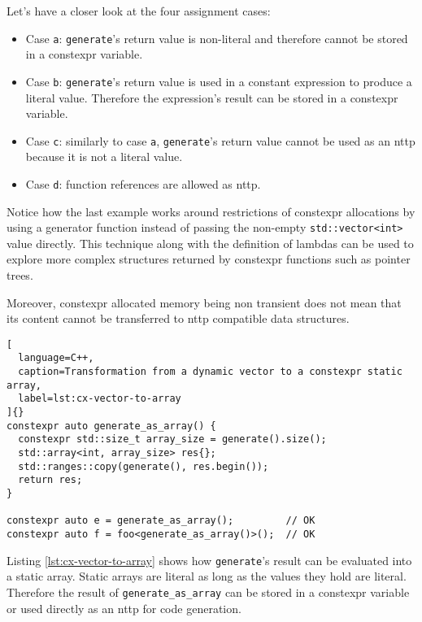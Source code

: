\documentclass[../main]{subfiles}
\begin{document}
Let's have a closer look at the four assignment cases:

\begin{itemize}
\item Case \lstinline{a}: \lstinline{generate}'s return value is non-literal
      and therefore cannot be stored in a \gls{constexpr} variable.
\item Case \lstinline{b}: \lstinline{generate}'s return value is used in a
      constant expression to produce a literal value.
      Therefore the expression's result can be stored in a \gls{constexpr} variable.
\item Case \lstinline{c}: similarly to case \lstinline{a},
      \lstinline{generate}'s return value cannot be used as an \gls{nttp} because it
      is not a literal value.
\item Case \lstinline{d}: function references are allowed as \gls{nttp}\acrpluralsuffix{}.
\end{itemize}

Notice how the last example works around restrictions of \gls{constexpr} allocations
by using a generator function instead of passing the non-empty
\lstinline{std::vector<int>} value directly. This technique along with the
definition of lambdas can be used to explore more complex structures returned by
\gls{constexpr} functions such as pointer trees.

Moreover, \gls{constexpr} allocated memory being non transient does not mean that its
content cannot be transferred to \gls{nttp} compatible data structures.

\begin{lstlisting}[
  language=C++,
  caption=Transformation from a dynamic vector to a constexpr static array,
  label=lst:cx-vector-to-array
]{}
constexpr auto generate_as_array() {
  constexpr std::size_t array_size = generate().size();
  std::array<int, array_size> res{};
  std::ranges::copy(generate(), res.begin());
  return res;
}

constexpr auto e = generate_as_array();         // OK
constexpr auto f = foo<generate_as_array()>();  // OK
\end{lstlisting}

Listing \ref{lst:cx-vector-to-array} shows how \lstinline{generate}'s result
can be evaluated into a static array. Static arrays are literal as long
as the values they hold are literal. Therefore the result of
\lstinline{generate_as_array} can be stored in a \gls{constexpr} variable or used
directly as an \gls{nttp} for code generation.
\end{document}
